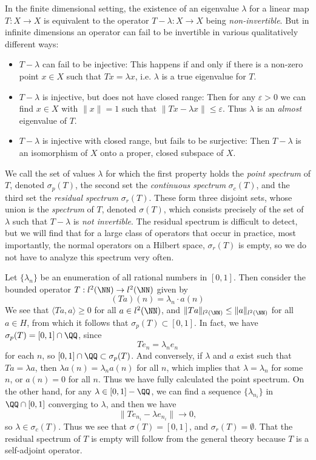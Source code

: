 In the finite dimensional setting, the existence of an eigenvalue $\lambda$ for a linear map $T: X \to X$ is equivalent to the operator $T - \lambda: X \to X$ being \emph{non-invertible}. But in infinite dimensions an operator can fail to be invertible in various qualitatively different ways:
%
\begin{itemize}
    \item $T - \lambda$ can fail to be injective: This happens if and only if there is a non-zero point $x \in X$ such that $Tx = \lambda x$, i.e. $\lambda$ is a true eigenvalue for $T$.
    \item $T - \lambda$ is injective, but does not have closed range: Then for any $\varepsilon > 0$ we can find $x \in X$ with $\| x \| = 1$ such that $\| Tx - \lambda x \| \leq \varepsilon$. Thus $\lambda$ is an \emph{almost} eigenvalue of $T$.
    \item $T - \lambda$ is injective with closed range, but fails to be surjective: Then $T - \lambda$ is an isomorphism of $X$ onto a proper, closed subspace of $X$.
\end{itemize}
%
We call the set of values $\lambda$ for which the first property holds the \emph{point spectrum} of $T$, denoted $\sigma_p(T)$, the second set the \emph{continuous spectrum} $\sigma_c(T)$, and the third set the \emph{residual spectrum} $\sigma_r(T)$. These form three disjoint sets, whose union is the \emph{spectrum} of $T$, denoted $\sigma(T)$, which consists precisely of the set of $\lambda$ such that $T - \lambda$ is \emph{not invertible}. The residual spectrum is difficult to detect, but we will find that for a large class of operators that occur in practice, most importantly, the normal operators on a Hilbert space, $\sigma_r(T)$ is empty, so we do not have to analyze this spectrum very often.

\begin{example}
    Let $\{ \lambda_n \}$ be an enumeration of all rational numbers in $[0,1]$. Then consider the bounded operator $T: l^2(\NN) \to l^2(\NN)$ given by
    \[ (Ta)(n) = \lambda_n \cdot a(n) \]
    We see that $\langle Ta, a \rangle \geq 0$ for all $a \in l^2(\NN)$, and $\| Ta \|_{l^2(\NN)} \leq \| a \|_{l^2(\NN)}$ for all $a \in H$, from which it follows that $\sigma_p(T) \subset [0,1]$. In fact, we have $\sigma_p(T) = [0,1] \cap \QQ$, since
    \[ Te_n = \lambda_n e_n \]
    for each $n$, so $[0,1] \cap \QQ \subset \sigma_p(T)$. And conversely, if $\lambda$ and $a$ exist such that $Ta = \lambda a$, then $\lambda a(n) = \lambda_n a(n)$ for all $n$, which implies that $\lambda = \lambda_n$ for some $n$, or $a(n) = 0$ for all $n$. Thus we have fully calculated the point spectrum. On the other hand, for any $\lambda \in [0,1] - \QQ$, we can find a sequence $\{ \lambda_{n_i} \}$ in $\QQ \cap [0,1]$ converging to $\lambda$, and then we have
    \[ \| T e_{n_i} - \lambda e_{n_i} \| \to 0, \]
    so $\lambda \in \sigma_c(T)$. Thus we see that $\sigma(T) = [0,1]$, and $\sigma_r(T) = \emptyset$. That the residual spectrum of $T$ is empty will follow from the general theory because $T$ is a self-adjoint operator.
\end{example}


